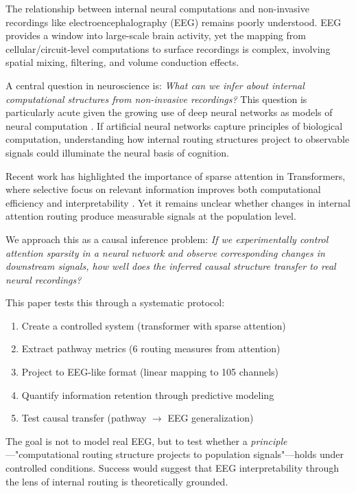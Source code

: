 The relationship between internal neural computations and non-invasive recordings like electroencephalography (EEG) remains poorly understood. EEG provides a window into large-scale brain activity, yet the mapping from cellular/circuit-level computations to surface recordings is complex, involving spatial mixing, filtering, and volume conduction effects.

A central question in neuroscience is: \textit{What can we infer about internal computational structures from non-invasive recordings?} This question is particularly acute given the growing use of deep neural networks as models of neural computation \cite{Kriegeskorte2015, Yamins2016}. If artificial neural networks capture principles of biological computation, understanding how internal routing structures project to observable signals could illuminate the neural basis of cognition.

Recent work has highlighted the importance of sparse attention in Transformers, where selective focus on relevant information improves both computational efficiency and interpretability \cite{Child2019, Zaheer2020}. Yet it remains unclear whether changes in internal attention routing produce measurable signals at the population level.

We approach this as a causal inference problem: \textit{If we experimentally control attention sparsity in a neural network and observe corresponding changes in downstream signals, how well does the inferred causal structure transfer to real neural recordings?}

This paper tests this through a systematic protocol:

\begin{enumerate}
    \item Create a controlled system (transformer with sparse attention)
    \item Extract pathway metrics (6 routing measures from attention)
    \item Project to EEG-like format (linear mapping to 105 channels)
    \item Quantify information retention through predictive modeling
    \item Test causal transfer (pathway $\rightarrow$ EEG generalization)
\end{enumerate}

The goal is not to model real EEG, but to test whether a \textit{principle}—"computational routing structure projects to population signals"—holds under controlled conditions. Success would suggest that EEG interpretability through the lens of internal routing is theoretically grounded.
